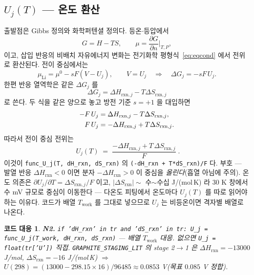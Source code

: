 \documentclass[11pt,a4paper]{article}
\newtheorem*{codebox}{코드 대응}
\newcommand{\rxn}{\mathrm{rxn}}
\newcommand{\work}{\mathrm{work}}
\newcommand{\code}[1]{\texttt{#1}}
\begin{document}
\subsection{$U_j(T)$ — 온도 환산}
출발점은 Gibbs 정의와 화학퍼텐셜 정의다. 등온$\cdot$등압에서
\begin{equation}
G=H-TS,\qquad
\mu=\frac{\partial G}{\partial n}\Big|_{T,P},
\label{eq:gmu_bridge}
\end{equation}
이고, 삽입 반응의 비배치 자유에너지 변화는 전기화학 평형식~\eqref{eq:eqcond} 에서 전위로 환산된다. 전이 중심에서는
\begin{equation}
\mu_\mathrm{Li}=\mu^0-sF(V-U_j),
\qquad
V=U_j
\quad\Longrightarrow\quad
\Delta G_j=-sF\,U_j .
\label{eq:Uj_depart}
\end{equation}
한편 반응 열역학은 같은 $\Delta G_j$ 를
\begin{equation}
\Delta G_j=\Delta H_{\rxn,j}-T\Delta S_{\rxn,j}
\label{eq:Uj_gibbs}
\end{equation}
로 쓴다. 두 식을 같은 양으로 놓고 방전 기준 $s=+1$ 을 대입하면
\begin{align}
-F\,U_j
&=\Delta H_{\rxn,j}-T\Delta S_{\rxn,j},\notag\\
F\,U_j
&=-\Delta H_{\rxn,j}+T\Delta S_{\rxn,j}.
\label{eq:Uj_algebra}
\end{align}
따라서 전이 중심 전위는
\begin{equation}
\boxed{\;U_j(T)\;=\;\frac{-\Delta H_{\rxn,j}+T\,\Delta S_{\rxn,j}}{F}\;.}
\label{eq:Uj}
\end{equation}
이것이 \code{func\_U\_j(T, dH\_rxn, dS\_rxn)} 의 \code{(-dH\_rxn + T*dS\_rxn)/F} 다. 부호 — 발열 반응
$\Delta H_\rxn<0$ 이면 분자 $-\Delta H_\rxn>0$ 이 중심을 \emph{올린다}(흡열 아님에 주의). 온도 의존은
$\partial U_j/\partial T=\Delta S_{\rxn,j}/F$ 이고, $|\Delta S_\rxn|\sim$ 수$\sim$수십 J/(mol\,K) 라 $30$ K 창에서 수 mV
규모로 중심이 이동한다 — 다온도 피팅에서 온도마다 $U_j(T)$ 를 따로 읽어야 하는 이유다. 코드가 배열 $T_\work$ 를 그대로
넣으므로 $U_j$ 는 비등온이면 격자별 배열로 나온다.

\begin{codebox}
\textbf{N2.} \code{if 'dH\_rxn' in tr and 'dS\_rxn' in tr: U\_j = func\_U\_j(T\_work, dH\_rxn, dS\_rxn)}
— 배열 $T_\work$ 대응. 없으면 \code{U\_j = float(tr['U'])} 직접. \code{GRAPHITE\_STAGING\_LIT} 의 stage 2$\to$1 은
$\Delta H_\rxn=-13000$ J/mol, $\Delta S_\rxn=-16$ J/(mol\,K) $\Rightarrow$ $U(298)=(13000-298.15\times16)/96485
\approx0.0853$ V(목표 $0.085$ V 정합).
\end{codebox}
\end{document}
